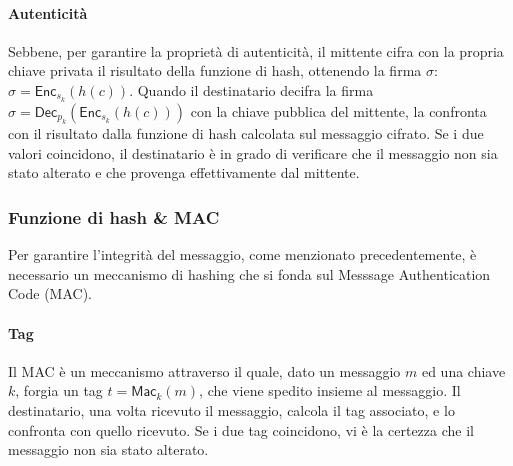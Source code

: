 \documentclass[a4paper,12pt]{article}
\begin{document}
\paragraph{Autenticità}
Sebbene, per garantire la proprietà di autenticità, il mittente cifra con la propria chiave privata il risultato della funzione di hash, ottenendo la firma $\sigma$: $\sigma=\mathsf{Enc}_{s_k}(h(c))$. Quando il destinatario decifra la firma $\sigma=\mathsf{Dec}_{p_k}\left(\mathsf{Enc}_{s_k}\left(h\left(c\right)\right)\right)$ con la chiave pubblica del mittente, la confronta con il risultato dalla funzione di hash calcolata sul messaggio cifrato. Se i due valori coincidono, il destinatario è in grado di verificare che il messaggio non sia stato alterato e che provenga effettivamente dal mittente.
\subsubsection{Funzione di hash \& MAC}
Per garantire l'integrità del messaggio, come menzionato precedentemente, è necessario un meccanismo di hashing che si fonda sul Messsage Authentication Code (MAC).
\paragraph{Tag}
Il MAC è un meccanismo attraverso il quale, dato un messaggio $m$ ed una chiave $k$, forgia un tag $t=\mathsf{Mac}_k(m)$, che viene spedito insieme al messaggio. Il destinatario, una volta ricevuto il messaggio, calcola il tag associato, e lo confronta con quello ricevuto. Se i due tag coincidono, vi è la certezza che il messaggio non sia stato alterato.
\end{document}
